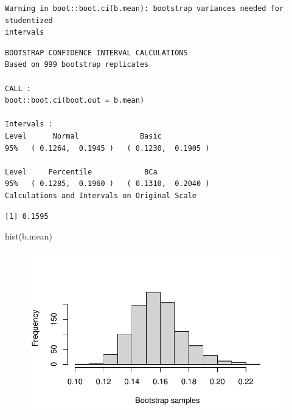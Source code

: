 \documentclass[
  letterpaper,
  DIV=11,
  numbers=noendperiod]{scrreprt}
\newenvironment{Shaded}{\begin{snugshade}}{\end{snugshade}}
\newcommand{\FunctionTok}[1]{\textcolor[rgb]{0.28,0.35,0.67}{#1}}
\newcommand{\NormalTok}[1]{\textcolor[rgb]{0.00,0.23,0.31}{#1}}
\newcommand{\SpecialCharTok}[1]{\textcolor[rgb]{0.37,0.37,0.37}{#1}}
\begin{document}
\begin{verbatim}
Warning in boot::boot.ci(b.mean): bootstrap variances needed for studentized
intervals
\end{verbatim}

\begin{verbatim}
BOOTSTRAP CONFIDENCE INTERVAL CALCULATIONS
Based on 999 bootstrap replicates

CALL : 
boot::boot.ci(boot.out = b.mean)

Intervals : 
Level      Normal              Basic         
95%   ( 0.1264,  0.1945 )   ( 0.1230,  0.1905 )  

Level     Percentile            BCa          
95%   ( 0.1285,  0.1960 )   ( 0.1310,  0.2040 )  
Calculations and Intervals on Original Scale
\end{verbatim}

\begin{Shaded}
\end{Shaded}

\begin{verbatim}
[1] 0.1595
\end{verbatim}

\begin{Shaded}
\begin{Highlighting}[]
\FunctionTok{hist}\NormalTok{(b.mean)}
\end{Highlighting}
\end{Shaded}

\begin{figure}[H]

{\centering \includegraphics{data-sads_files/figure-pdf/unnamed-chunk-6-1.pdf}

}

\end{figure}
\end{document}

